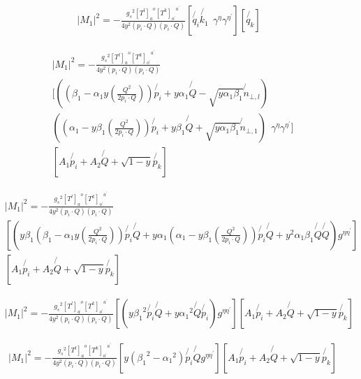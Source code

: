 \begin{equation}
\begin{split}
|M_1|^2=-\frac{{g_s}^2 {[T^l]_a}^o {[T^k]_{o^{\prime}}}^{a^{\prime}}}{4y^2(p_i \cdot Q)(p_i \cdot Q) }[\not{q_i}\not{k_1}\:\: {\gamma}^{\eta}{\gamma}^{{\eta}^{\prime}}][\not{q_k}]
\end{split}
\end{equation}

\begin{equation}
\begin{split}
&|M_1|^2=-\frac{{g_s}^2 {[T^l]_a}^o {[T^k]_{o^{\prime}}}^{a^{\prime}}}{4y^2(p_i \cdot Q)(p_i \cdot Q) }\\
&[((\beta_1 -\alpha_1 y(\frac{Q^2}{2p_i \cdot Q}))\not{p_i} + y\alpha_1\not{Q} - \sqrt{y\alpha_1\beta_1}\not{n}_{\bot,l})\\
&((\alpha_1 -y\beta_1(\frac{Q^2}{2p_i \cdot Q})) \not{p_i} + y\beta_1\not{Q} + \sqrt{y\alpha_1\beta_1}\not{n}_{\bot,1} )\:\: {\gamma}^{\eta}{\gamma}^{{\eta}^{\prime}}]\\
&[A_1\not{p_i} + A_2\not{Q} + \sqrt{1-y}\not{p_k}]
\end{split}
\end{equation}

\begin{equation}
\begin{split}
&|M_1|^2=-\frac{{g_s}^2 {[T^l]_a}^o {[T^k]_{o^{\prime}}}^{a^{\prime}}}{4y^2(p_i \cdot Q)(p_i \cdot Q) }\\
&[(y\beta_1(\beta_1 -\alpha_1 y(\frac{Q^2}{2p_i \cdot Q}))\not{p_i}\not{Q} + y\alpha_1(\alpha_1 -y\beta_1(\frac{Q^2}{2p_i \cdot Q})) \not{p_i}\not{Q}+y^2\alpha_1\beta_1\not{Q}\not{Q} )g^{{\eta}{{\eta}^{\prime}}}]\\
&[A_1\not{p_i} + A_2\not{Q} + \sqrt{1-y}\not{p_k}]
\end{split}
\end{equation}

\begin{equation}
\begin{split}
&|M_1|^2=-\frac{{g_s}^2 {[T^l]_a}^o {[T^k]_{o^{\prime}}}^{a^{\prime}}}{4y^2(p_i \cdot Q)(p_i \cdot Q) }[(y{\beta_1}^2\not{p_i}\not{Q} + y{\alpha_1}^2 \not{Q}\not{p_i})g^{{\eta}{{\eta}^{\prime}}}][A_1\not{p_i} + A_2\not{Q} + \sqrt{1-y}\not{p_k}]
\end{split}
\end{equation}

\begin{equation}
\begin{split}
&|M_1|^2=-\frac{{g_s}^2 {[T^l]_a}^o {[T^k]_{o^{\prime}}}^{a^{\prime}}}{4y^2(p_i \cdot Q)(p_i \cdot Q) }[y({\beta_1}^2- {\alpha_1}^2) \not{p_i}\not{Q}g^{{\eta}{{\eta}^{\prime}}}][A_1\not{p_i} + A_2\not{Q} + \sqrt{1-y}\not{p_k}]
\end{split}
\end{equation}

